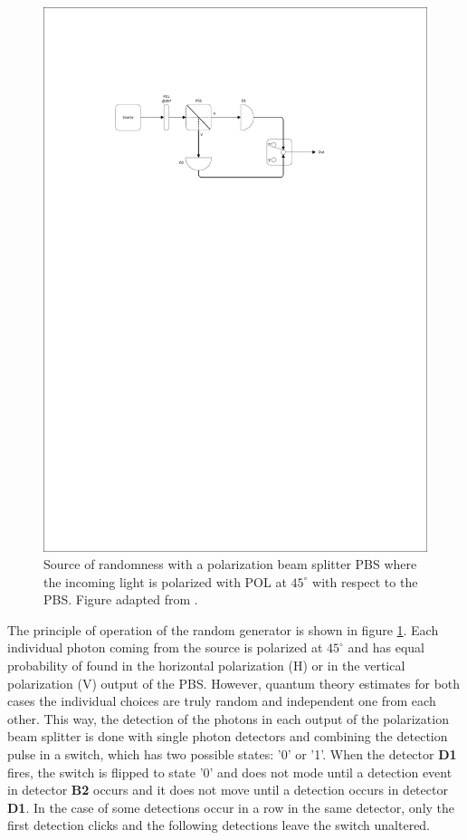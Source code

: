 \begin{figure}[H]
    \centering
        \includegraphics[clip, trim=3cm 20cm 5cm 5cm, width=1.00\textwidth]{./sdf/quantum_random_number_generator/figures_raw/Random_Number_Generator.pdf}
    \caption{Source of randomness with a polarization beam splitter PBS where the incoming light is polarized with POL at $45^{\circ}$ with respect to the PBS. Figure adapted from \cite{Zeilinger}.}\label{qrng}
\end{figure}

The principle of operation of the random generator is shown in figure \ref{qrng}. Each individual photon coming from the source is polarized at $45^\circ$ and has equal probability of found in the horizontal polarization (H) or in the vertical polarization (V) output of the PBS. However, quantum theory estimates for both cases the individual choices are truly random and independent one from each other. This way, the detection of the photons in each output of the polarization beam splitter is done with single photon detectors and combining the detection pulse in a switch, which has two possible states: '0' or '1'. When the detector \textbf{D1} fires, the switch is flipped to state '0' and does not mode until a detection event in detector \textbf{B2} occurs and it does not move until a detection occurs in detector \textbf{D1}. In the case of some detections occur in a row in the same detector, only the first detection clicks and the following detections leave the switch unaltered.


